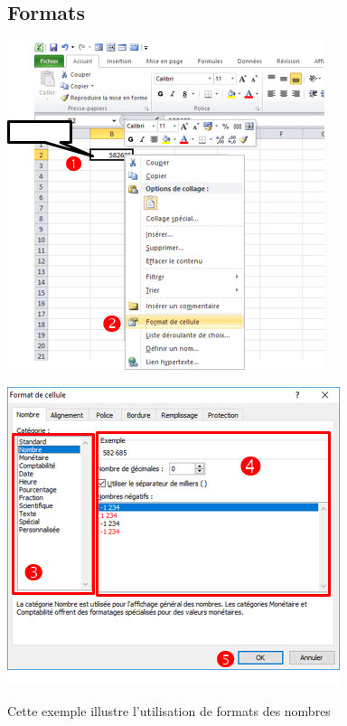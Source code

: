 \subsection{Formats}
\begin{center} 
	\includegraphics[scale=0.2,width=0.7 \linewidth]{img/format1} 
\end{center}
 \begin{center}  
 	\includegraphics[scale=0.2,width=0.7 \linewidth]{img/format2}
 \end{center}
\begin{Exemple}
Cette exemple illustre l'utilisation de formats des nombres
\end{Exemple} 
